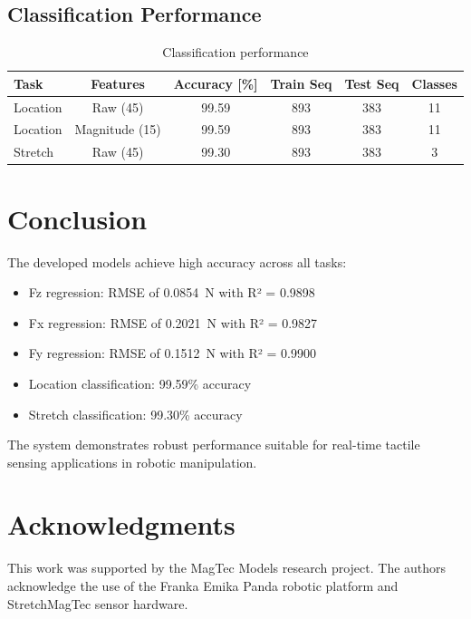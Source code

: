 \documentclass[11pt,a4paper]{article}
\begin{document}
\subsection{Classification Performance}

\begin{table}[H]
\centering
\begin{tabular}{@{}lccccc@{}}
\toprule
\textbf{Task} & \textbf{Features} & \textbf{Accuracy [\%]} & \textbf{Train Seq} & \textbf{Test Seq} & \textbf{Classes} \\
\midrule
Location & Raw (45) & 99.59 & 893 & 383 & 11 \\
Location & Magnitude (15) & 99.59 & 893 & 383 & 11 \\
Stretch & Raw (45) & 99.30 & 893 & 383 & 3 \\
\bottomrule
\end{tabular}
\caption{Classification performance}
\label{tab:classification}
\end{table}

\section{Conclusion}

The developed models achieve high accuracy across all tasks:
\begin{itemize}
    \item Fz regression: RMSE of \SI{0.0854}{\newton} with R² = 0.9898
    \item Fx regression: RMSE of \SI{0.2021}{\newton} with R² = 0.9827
    \item Fy regression: RMSE of \SI{0.1512}{\newton} with R² = 0.9900
    \item Location classification: 99.59\% accuracy
    \item Stretch classification: 99.30\% accuracy
\end{itemize}

The system demonstrates robust performance suitable for real-time tactile sensing applications in robotic manipulation.

\section{Acknowledgments}

This work was supported by the MagTec Models research project. The authors acknowledge the use of the Franka Emika Panda robotic platform and StretchMagTec sensor hardware.
\end{document}
